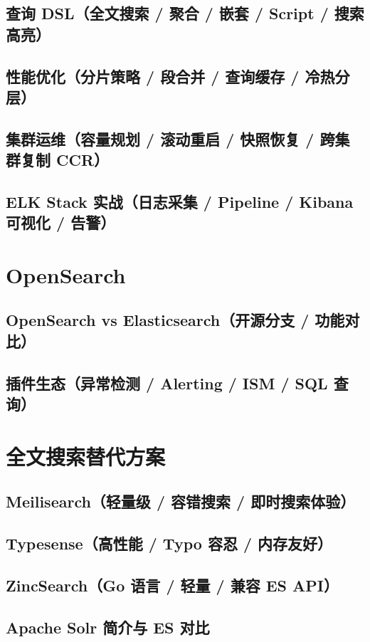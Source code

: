 \documentclass[12pt,UTF8]{ctexbook}
\begin{document}
    \subsection{查询 DSL（全文搜索 / 聚合 / 嵌套 / Script / 搜索高亮）}
    \subsection{性能优化（分片策略 / 段合并 / 查询缓存 / 冷热分层）}
    \subsection{集群运维（容量规划 / 滚动重启 / 快照恢复 / 跨集群复制 CCR）}
    \subsection{ELK Stack 实战（日志采集 / Pipeline / Kibana 可视化 / 告警）}

  \section{OpenSearch}
    \subsection{OpenSearch vs Elasticsearch（开源分支 / 功能对比）}
    \subsection{插件生态（异常检测 / Alerting / ISM / SQL 查询）}

  \section{全文搜索替代方案}
    \subsection{Meilisearch（轻量级 / 容错搜索 / 即时搜索体验）}
    \subsection{Typesense（高性能 / Typo 容忍 / 内存友好）}
    \subsection{ZincSearch（Go 语言 / 轻量 / 兼容 ES API）}
    \subsection{Apache Solr 简介与 ES 对比}
\end{document}
